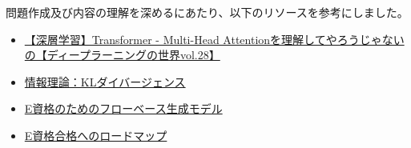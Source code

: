 \documentclass[
  letterpaper,
  DIV=11,
  numbers=noendperiod]{scrreprt}
\providecommand{\tightlist}{%
  \setlength{\itemsep}{0pt}\setlength{\parskip}{0pt}}
\begin{document}
問題作成及び内容の理解を深めるにあたり、以下のリソースを参考にしました。

\begin{itemize}
\tightlist
\item
  \href{https://www.youtube.com/watch?v=50XvMaWhiTY}{【深層学習】Transformer
  - Multi-Head
  Attentionを理解してやろうじゃないの【ディープラーニングの世界vol.28】}
\item
  \href{https://note.com/kikaben/n/n1b8b8fa1a0e6}{情報理論：KLダイバージェンス}
\item
  \href{https://engineernoi.hatenablog.com/entry/2024/05/12/233601}{E資格のためのフローベース生成モデル}
\item
  \href{https://ai4mdx.com/index.html}{E資格合格へのロードマップ}
\end{itemize}
\end{document}
